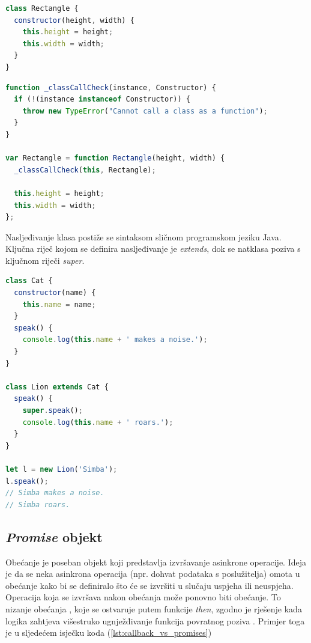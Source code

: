 \documentclass[times, utf8, zavrsni, numeric]{fer}
\newcommand{\razmakp}{\vspace{18pt}}
\newcommand{\razmaks}{\vspace{10pt}}
\begin{document}
\razmakp
\begin{lstlisting}[language=JavaScript, caption={Primjer klase}, label={lst:class_example}]
class Rectangle {
  constructor(height, width) {
    this.height = height;
    this.width = width;
  }
}
\end{lstlisting}
\razmaks

\razmakp
\begin{lstlisting}[language=JavaScript, caption={Isječak koda \ref{lst:class_example} preveden u stari standard}, label={lst:class_example_old_js}]
function _classCallCheck(instance, Constructor) {
  if (!(instance instanceof Constructor)) {
    throw new TypeError("Cannot call a class as a function");
  }
}

var Rectangle = function Rectangle(height, width) {
  _classCallCheck(this, Rectangle);

  this.height = height;
  this.width = width;
};
\end{lstlisting}
\razmaks

Nasljeđivanje klasa postiže se sintaksom sličnom programskom jeziku Java.
Ključna riječ kojom se definira nasljeđivanje je \emph{extends}, dok se natklasa poziva s ključnom riječi \emph{super}.

\razmakp
\begin{lstlisting}[language=JavaScript, caption={Primjer naljeđivanja}]
class Cat { 
  constructor(name) {
    this.name = name;
  }
  speak() {
    console.log(this.name + ' makes a noise.');
  }
}

class Lion extends Cat {
  speak() {
    super.speak();
    console.log(this.name + ' roars.');
  }
}

let l = new Lion('Simba');
l.speak(); 
// Simba makes a noise.
// Simba roars.
\end{lstlisting}
\razmaks


\subsection{\emph{Promise} objekt} \label{sec:promise}

Obećanje  je poseban objekt koji predstavlja izvršavanje asinkrone operacije.
Ideja je da se neka asinkrona operacija (npr. dohvat podataka s poslužitelja) omota u obećanje kako bi se definiralo što će se izvršiti u slučaju uspjeha ili neuspjeha.
Operacija koja se izvršava nakon obećanja može ponovno biti obećanje.
To nizanje obećanja , koje se ostvaruje putem funkcije \emph{then}, zgodno je rješenje kada logika zahtjeva višestruko ugnježđivanje funkcija povratnog poziva \citep{MDNUsingPromises}.
Primjer toga je u sljedećem isječku koda (\ref{lst:callback_vs_promises})
\end{document}
